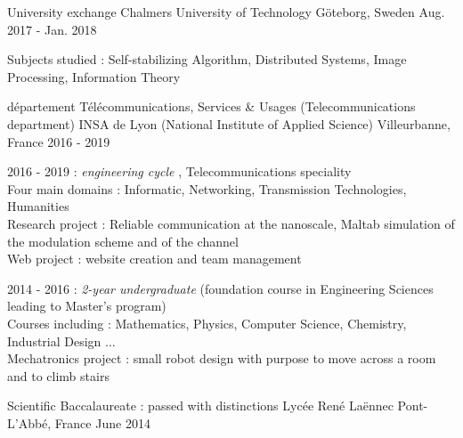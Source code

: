 

\begin{cventries}

  \cventry
    {University exchange} %
    {Chalmers University of Technology} %
    {Göteborg, Sweden} %
    {Aug. 2017 - Jan. 2018} %
    {
      \begin{cvitems} %
        \item {Subjects studied : Self-stabilizing Algorithm, Distributed Systems, Image Processing, Information Theory}
      \end{cvitems}
    }

  \cventry
    {département Télécommunications, Services \& Usages (Telecommunications department)} %
    {INSA de Lyon (National Institute of Applied Science)} %
    {Villeurbanne, France} %
    {2016 - 2019} %
    {
      \begin{cvitems} %
        \item {2016 - 2019 : \emph{engineering cycle} , Telecommunications speciality 
        \\ Four main domains : Informatic, Networking, Transmission Technologies, Humanities 
        \\Research project : Reliable communication at the nanoscale, Maltab simulation of the modulation scheme and of the channel
        \\Web project : website creation and team management}
        \item {2014 - 2016 : \emph{2-year undergraduate} (foundation course in Engineering Sciences leading to Master's program) 
        \\Courses including : Mathematics, Physics, Computer Science, Chemistry, Industrial Design ... 
        \\Mechatronics project : small robot design with purpose to move across a room and to climb stairs} 
      \end{cvitems}
    } 
  \cventryS
    {Scientific Baccalaureate : passed with distinctions} %
    {Lycée René Laënnec} %
    {Pont-L'Abbé, France} %
    {June 2014} %
    
\end{cventries}
